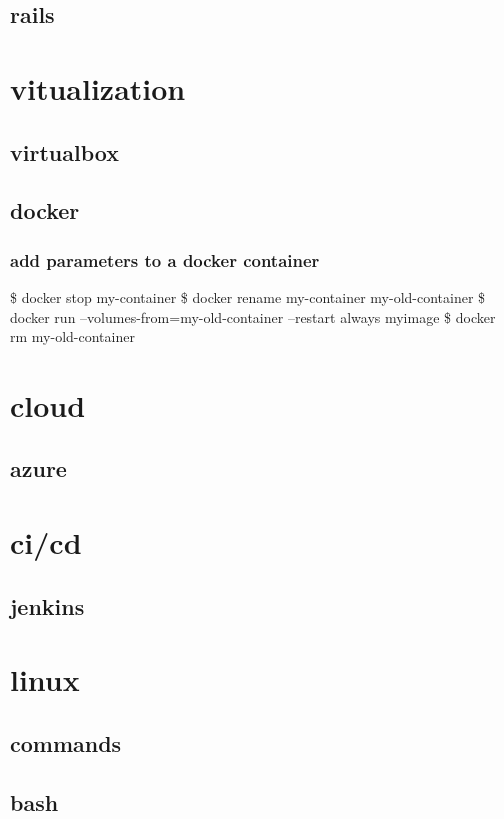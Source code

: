 \documentclass{report}
\begin{document}
\section{rails}

\chapter{vitualization}
\section{virtualbox}
\section{docker}
\subsection{add parameters to a docker container}
\begin{displayquote}
\$ docker stop my-container \newline
\$ docker rename my-container my-old-container \newline
\$ docker run --volumes-from=my-old-container --restart always myimage \newline
\$ docker rm my-old-container
\end{displayquote}

\chapter{cloud}
\section{azure}

\chapter{ci/cd}
\section{jenkins}

\chapter{linux}
\section{commands}
\section{bash}
\end{document}
